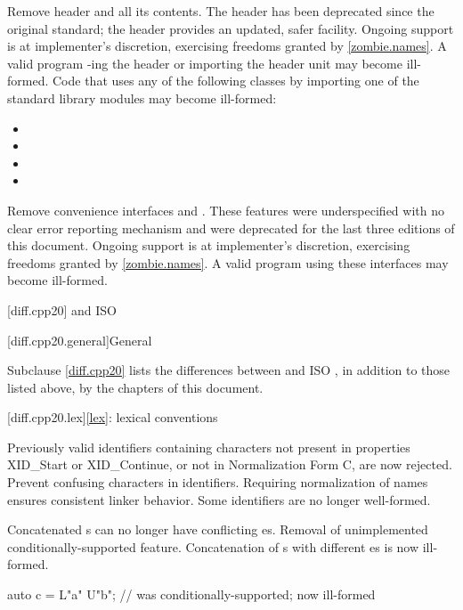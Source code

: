 \nodiffref
\change
Remove header  and all its contents.
\rationale
The header has been deprecated since the original \Cpp{} standard; the
 header provides an updated, safer facility.
Ongoing support is at implementer's discretion,
exercising freedoms granted by \ref{zombie.names}.
\effect
A valid \CppXXIII{} program -ing the header or importing the
header unit may become ill-formed. Code that uses any of the following classes
by importing one of the standard library modules may become ill-formed:
\begin{itemize}
\item {}
\item {}
\item {}
\item {}
\end{itemize}

\nodiffref
\change
Remove convenience interfaces  and
.
\rationale
These features were underspecified with no clear error reporting mechanism and
were deprecated for the last three editions of this document.
Ongoing support is at implementer's discretion,
exercising freedoms granted by \ref{zombie.names}.
\effect
A valid \CppXXIII{} program using these interfaces may become ill-formed.

[diff.cpp20]{\Cpp{} and ISO \CppXX{}}

[diff.cpp20.general]{General}

\pnum
{}%
Subclause \ref{diff.cpp20} lists the differences between \Cpp{} and
ISO \CppXX{},
in addition to those listed above,
by the chapters of this document.

[diff.cpp20.lex]{\ref*{lex}: lexical conventions}

%
%
\change
Previously valid identifiers containing characters
not present in  properties XID_Start or XID_Continue, or
not in Normalization Form C, are now rejected.
\rationale
Prevent confusing characters in identifiers.
Requiring normalization of names ensures consistent linker behavior.
\effect
Some identifiers are no longer well-formed.

\change
Concatenated s can no longer have
conflicting es.
\rationale
Removal of unimplemented conditionally-supported feature.
\effect
Concatenation of s
with different es
is now ill-formed.
\begin{example}
\begin{codeblock}
auto c = L"a" U"b";             // was conditionally-supported; now ill-formed
\end{codeblock}
\end{example}


